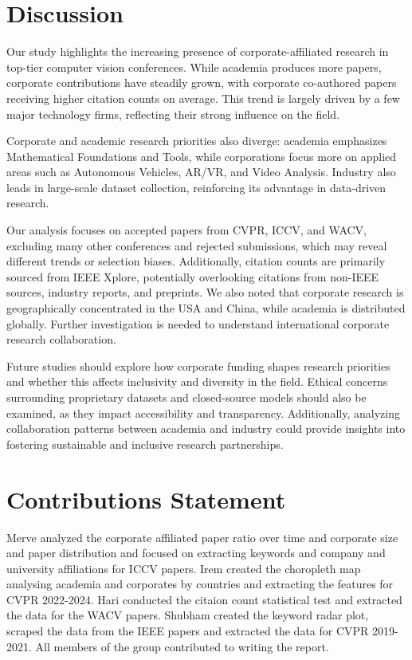 \documentclass{article}
\begin{document}
\section{Discussion}
Our study highlights the increasing presence of corporate-affiliated research in top-tier computer vision conferences. While academia produces more papers, corporate contributions have steadily grown, with corporate co-authored papers receiving higher citation counts on average. This trend is largely driven by a few major technology firms, reflecting their strong influence on the field.

Corporate and academic research priorities also diverge: academia emphasizes Mathematical Foundations and Tools, while corporations focus more on applied areas such as Autonomous Vehicles, AR/VR, and Video Analysis. Industry also leads in large-scale dataset collection, reinforcing its advantage in data-driven research.

Our analysis focuses on accepted papers from CVPR, ICCV, and WACV, excluding many other conferences and rejected submissions, which may reveal different trends or selection biases. Additionally, citation counts are primarily sourced from IEEE Xplore, potentially overlooking citations from non-IEEE sources, industry reports, and preprints. We also noted that corporate research is geographically concentrated in the USA and China, while academia is distributed globally. Further investigation is needed to understand international corporate research collaboration.

Future studies should explore how corporate funding shapes research priorities and whether this affects inclusivity and diversity in the field. Ethical concerns surrounding proprietary datasets and closed-source models should also be examined, as they impact accessibility and transparency. Additionally, analyzing collaboration patterns between academia and industry could provide insights into fostering sustainable and inclusive research partnerships.

\section{Contributions Statement}

Merve analyzed the corporate affiliated paper ratio over time and corporate size and paper distribution and focused on extracting keywords and company and university affiliations for ICCV papers. Irem created the choropleth map analysing academia and corporates by countries and extracting the features for CVPR 2022-2024. Hari conducted the citaion count statistical test and extracted the data for the WACV papers. Shubham created the keyword radar plot, scraped the data from the IEEE papers and extracted the data for CVPR 2019-2021. All members of the group contributed to writing the report.
\end{document}

